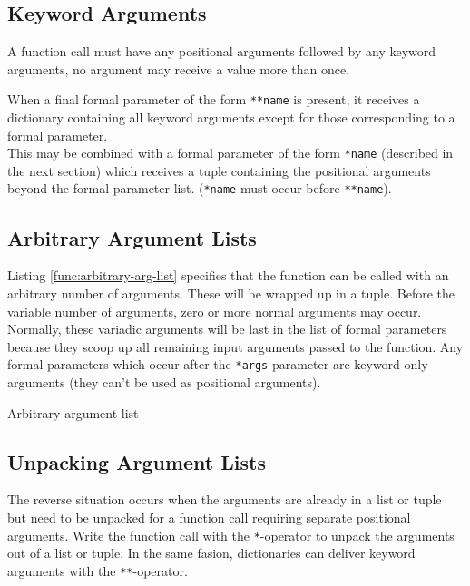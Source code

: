 \begin{program}
\caption{Default arg values are evaluated only once%
\label{func:default-val-eval-once}}
\end{program}

\subsection{Keyword Arguments}

A function call must have any positional arguments
followed by any keyword arguments,
no argument may receive a value more than once.

When a final formal parameter of the form \verb=**name= is present,
it receives a dictionary containing all keyword arguments
except for those corresponding to a formal parameter.\\
This may be combined with a formal parameter of the form \verb=*name=
(described in the next section)
which receives a tuple containing
the positional arguments beyond the formal parameter list.
(\verb=*name= must occur before \verb=**name=).

\subsection{Arbitrary Argument Lists}

Listing \ref{func:arbitrary-arg-list} specifies
that the function can be called with an arbitrary number of arguments.
These will be wrapped up in a tuple.
Before the variable number of arguments,
zero or more normal arguments may occur.
Normally, these variadic arguments
will be last in the list of formal parameters
because they scoop up all remaining input arguments passed to the function.
Any formal parameters which occur after the \verb=*args= parameter
are keyword-only arguments (they can't be used as positional arguments).

\begin{program}
\caption{Arbitrary argument list\label{func:arbitrary-arg-list}}
\end{program}

\subsection{Unpacking Argument Lists}
The reverse situation occurs when the arguments are already in a list or tuple
but need to be unpacked
for a function call requiring separate positional arguments.
Write the function call with the \verb=*=-operator
to unpack the arguments out of a list or tuple.
In the same fasion, dictionaries can deliver keyword arguments
with the \verb=**=-operator.

